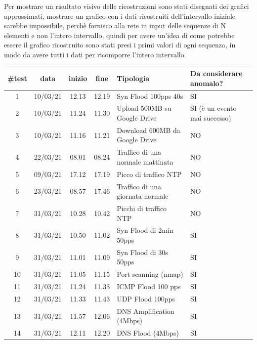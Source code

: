 Per mostrare un risultato visivo delle ricostruzioni sono stati disegnati dei grafici approssimati, mostrare un grafico con i dati ricostruiti dell'intervallo iniziale sarebbe impossibile, perchè fornisco alla rete in input delle sequenze di N elementi e non l'intero intervallo, quindi per avere un'idea di come potrebbe essere il grafico ricostruito sono stati presi i primi valori di ogni sequenza, in modo da avere tutti i dati per ricomporre l'intero intervallo.
\begin{table}
    \begin{tabularx}{\textwidth}{||c c c c X X||} 
        \hline
        \#test & data  & inizio & fine & Tipologia & Da considerare anomalo? \\ [0.5ex] 
        \hline\hline
        1 & 10/03/21 & 12.13 & 12.19 & Syn Flood 100pps 40s & SI\\ 
        \hline
        2 & 10/03/21 & 11.24 & 11.30
         & Upload 500MB su Google Drive & SI (è un evento mai successo)\\ 
        \hline
        3 & 10/03/21 & 11.16 & 11.21 & Download 600MB da Google Drive & NO\\ 
        \hline 
        4 & 22/03/21 & 08.01 & 08.24 & Traffico di una normale mattinata & NO\\
        \hline
        5 & 09/03/21 & 17.12 & 17.19 & Picco di traffico NTP & NO\\
        \hline
        6 & 23/03/21 & 08.57 & 17.46
         & Traffico di una giornata normale & NO\\ 
        \hline
        7 & 31/03/21 & 10.28 & 10.42 & Picchi di traffico NTP & NO\\ 
        \hline 
        8 & 31/03/21 & 10.50 & 11.02 & Syn Flood di 2min 50pps & SI\\
        \hline
        9 & 31/03/21 & 11.01 & 11.09 & Syn Flood di 30s 50pps & SI\\        
        \hline
        10 & 31/03/21 & 11.05 & 11.15 & Port scanning (nmap) & SI\\
        \hline
        11 & 31/03/21 & 11.24 & 11.33 & ICMP Flood 100 pps & SI\\
        \hline
        12 & 31/03/21 & 11.33 & 11.43
         & UDP Flood 100pps & SI\\ 
        \hline
        13 & 31/03/21 & 11.57 & 12.06 & DNS Amplification (4Mbps) & SI\\ 
        \hline 
        14 & 31/03/21 & 12.11 & 12.20 & DNS Flood (4Mbps) & SI\\
        \hline

\end{tabularx}
\end{table}

